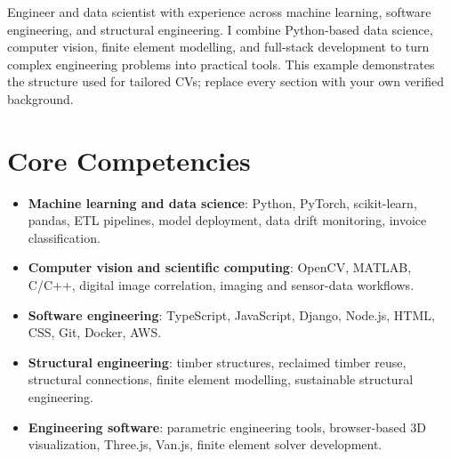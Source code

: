 \documentclass[11pt,a4paper,sans]{moderncv}
\begin{document}
\makecvtitle

\vspace{4pt}
\small{Engineer and data scientist with experience across machine learning, software engineering, and structural engineering. I combine Python-based data science, computer vision, finite element modelling, and full-stack development to turn complex engineering problems into practical tools. This example demonstrates the structure used for tailored CVs; replace every section with your own verified background.}

\section{Core Competencies}
\vspace{1pt}
\begin{itemize}
\item \textbf{Machine learning and data science}: Python, PyTorch, scikit-learn, pandas, ETL pipelines, model deployment, data drift monitoring, invoice classification.
\item \textbf{Computer vision and scientific computing}: OpenCV, MATLAB, C/C++, digital image correlation, imaging and sensor-data workflows.
\item \textbf{Software engineering}: TypeScript, JavaScript, Django, Node.js, HTML, CSS, Git, Docker, AWS.
\item \textbf{Structural engineering}: timber structures, reclaimed timber reuse, structural connections, finite element modelling, sustainable structural engineering.
\item \textbf{Engineering software}: parametric engineering tools, browser-based 3D visualization, Three.js, Van.js, finite element solver development.
\end{itemize}
\end{document}
